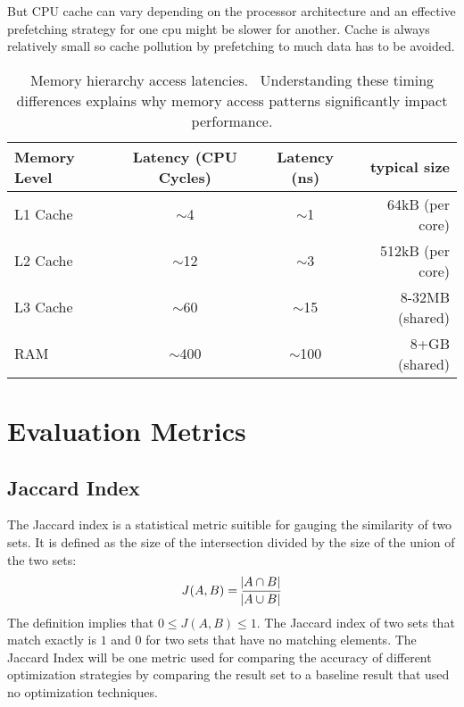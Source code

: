 But CPU cache can vary depending on the processor architecture and an effective prefetching strategy for one cpu might be slower for another. Cache is always relatively small so cache pollution by prefetching to much data has to be avoided.

\begin{table}[htbp]
    \centering
    \begin{tabular}{lccr}
        \toprule
        Memory Level & Latency (CPU Cycles) & Latency (ns) & typical size     \\
        \midrule
        L1 Cache     & $\sim$4              & $\sim$1      & 64kB (per core)  \\
        L2 Cache     & $\sim$12             & $\sim$3      & 512kB (per core) \\
        L3 Cache     & $\sim$60             & $\sim$15     & 8-32MB (shared)  \\
        RAM          & $\sim$400            & $\sim$100    & 8+GB (shared)    \\
        \bottomrule
    \end{tabular}
    \caption{Memory hierarchy access latencies.~\cite{memoryaccesslatency} Understanding these timing differences explains why memory access patterns significantly impact performance.}
    \label{tab:memory-latencies}
\end{table}

\section{Evaluation Metrics}
\subsection{Jaccard Index}
The Jaccard index is a statistical metric suitible for gauging the similarity of two sets. It is defined as the size of the intersection divided by the size of the union of the two sets:
$$J(A,B) = \frac{\abs{A \cap B}}{\abs{A \cup B}}$$
The definition implies that $0 \leq J(A,B) \leq 1$. The Jaccard index of two sets that match exactly is $1$ and $0$ for two sets that have no matching elements. The Jaccard Index will be one metric used for comparing the accuracy of different optimization strategies by comparing the result set to a baseline result that used no optimization techniques.

